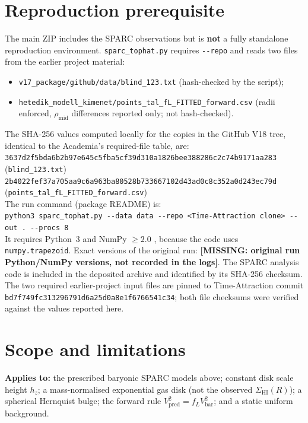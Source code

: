 \documentclass[10pt,a4paper]{article}
\newcommand{\missing}[1]{\textcolor{red!70!black}{\textbf{[MISSING: #1]}}}
\newcommand{\hash}[1]{{\footnotesize\texttt{#1}}}
\begin{document}
\section{Reproduction prerequisite}\label{sec:prereq}
The main ZIP includes the SPARC observations but is \textbf{not} a fully standalone reproduction environment. \texttt{sparc\_tophat.py} requires \texttt{-{}-repo} and reads two files from the earlier project material:
\begin{itemize}\itemsep0pt
\item \texttt{v17\_package/github/data/blind\_123.txt} (hash-checked by the script);
\item \texttt{hetedik\_modell\_kimenet/points\_tal\_fL\_FITTED\_forward.csv} (radii enforced, $\rho_\mathrm{mid}$ differences reported only; not hash-checked).
\end{itemize} The SHA-256 values computed locally for the copies in the GitHub V18 tree, identical to the Academia's required-file table, are:\\
\hash{3637d2f5bda6b2b97e645c5fba5cf39d310a1826bee388286c2c74b9171aa283} (\texttt{blind\_123.txt})\\
\hash{2b4022fef37a705aa9c6a963ba80528b733667102d43ad0c8c352a0d243ec79d} (\texttt{points\_tal\_fL\_FITTED\_forward.csv})\\
The run command (package README) is:\\
\mbox{\hash{python3 sparc\_tophat.py -{}-data data -{}-repo <Time-Attraction clone> -{}-out . -{}-procs 8}}\\
It requires Python~3 and NumPy $\ge2.0$ \cite{numpy}, because the code uses \texttt{numpy.trapezoid}. Exact versions of the original run: \missing{original run Python/NumPy versions, not recorded in the logs}. The SPARC analysis code is included in the deposited archive and identified by its SHA-256 checksum. The two required earlier-project input files are pinned to Time-Attraction commit \texttt{bd7f749fc313296791d6a25d0a8e1f6766541c34}; both file checksums were verified against the values reported here.

\section{Scope and limitations}
\textbf{Applies to:} the prescribed baryonic SPARC models above; constant disk scale height $h_z$; a mass-normalised exponential gas disk (not the observed $\Sigma_\mathrm{HI}(R)$); a spherical Hernquist bulge; the forward rule $V_\mathrm{pred}^2=f_LV_\mathrm{bar}^2$; and a static uniform background.
\end{document}
